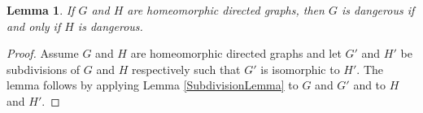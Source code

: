 \documentclass[12pt]{article}
\newtheorem{lem}[thm]{Lemma}
\theoremstyle{remark}
\newcommand{\fancy}[1]{\mathcal{#1}}
\def\G{\fancy{G}}
\begin{document}
\begin{lem}
If $G$ and $H$ are homeomorphic directed graphs, then $G$ is dangerous if and only if $H$ is dangerous.
\end{lem}
\begin{proof}
Assume $G$ and $H$ are homeomorphic directed graphs and let $G'$ and $H'$ be subdivisions of $G$ and $H$ respectively such that $G'$ is isomorphic to $H'$. The lemma follows by applying Lemma \ref{SubdivisionLemma} to $G$ and $G'$ and to $H$ and $H'$.
\end{proof}

\begin{comment}
\subsection{Partitioning}

if you can divide your graph into two so that both are not dangerous and edges go only one way between them then the whole thing is not dangerous.

\begin{lem}\label{PartitionLemma}
Let $G$ be a directed graph.  If $V(G)$ has a subset $A$ such that there are no edges from $A$ to $G - A$ and both $G[A]$ and $G - A$ are not dangerous, then $G$ is not dangerous.
\end{lem}
\begin{proof}
Assume $V(G)$ has a subset $A$ such that there are no edges from $A$ to $G - A$ and both $G[A]$ and $G - A$ are not dangerous.  Let $d$ be a denotation assignment on $V(G)$ such that $G = \G_{V(G), d}$.  Since $A$ has no edges to $G - A$ we see that $d$ restricted to $A$ is a denotation assignment on $A$, call it $d_A$.  Since $G[A]$ is not dangerous, we have an acceptable truth assignment $v_A$ on $A$ with respect to $d_A$.  Define $\kappa(0) = \bot$ and $\kappa(1) = \top$.  Now define a denotation assignment $d'$ on $G - A$ by letting $d'(x) = d(x)[\alpha \Rightarrow \kappa(v_A(\alpha)) \mid \alpha \in A]$.  Since $G - A$ is not dangerous, we have an acceptable truth assignment $v'$ on $V(G - A)$ with respect to $d'$.  By construction, the truth assignment $v$ defined by

\[v(x) = \begin{cases}
v_A(x) & \text{if } x \in A \\
v'(x) & \text{if } x \not \in A \\
\end{cases}\]

is acceptable on $V(G)$ with respect to $d$.  Since $d$ was arbitrary, $G$ is not dangerous.
\end{proof}
\end{comment}
\end{document}
